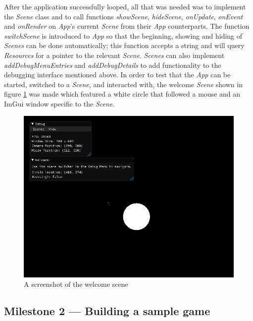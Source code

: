 \documentclass[11pt, a4paper]{report}
\begin{document}
After the application successfully looped, all that was needed was to implement the \emph{Scene} class and to call functions \emph{showScene}, \emph{hideScene}, \emph{onUpdate}, \emph{onEvent} and \emph{onRender} on \emph{App}'s current \emph{Scene} from their \emph{App} counterparts. The function \emph{switchScene} is introduced to \emph{App} so that the beginning, showing and hiding of \emph{Scenes} can be done automatically; this function accepts a string and will query \emph{Resources} for a pointer to the relevant \emph{Scene}. \emph{Scenes} can also implement \emph{addDebugMenuEntries} and \emph{addDebugDetails} to add functionality to the debugging interface mentioned above. In order to test that the \emph{App} can be started, switched to a \emph{Scene}, and interacted with, the welcome \emph{Scene} shown in figure \ref{fig:welcomeScene} was made which featured a white circle that followed a mouse and an ImGui window specific to the \emph{Scene}.

\begin{figure}[!h]
  \centering
  \includegraphics[width=\linewidth]{img/welcome_scene.png}
  \caption{A screenshot of the welcome scene}
  \label{fig:welcomeScene}
\end{figure}

\subsection[Building a sample game]{Milestone 2 --- Building a sample game}
\label{subsec:buildingASampleGame}
\end{document}
